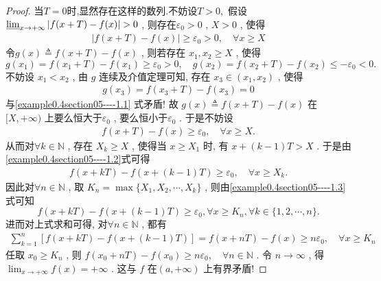 \documentclass[../../main.tex]{subfiles}
\begin{document}
\begin{proof}
当$T=0$时,显然存在这样的数列.不妨设$T>0,$
假设\(\varliminf_{x \to +\infty} \vert f(x + T) - f(x)\vert > 0\) , 则存在\(\varepsilon_0 > 0\) , \(X > 0\) , 使得
\begin{align}
\vert f(x + T) - f(x)\vert \geqslant \varepsilon_0>0,\quad \forall x \geqslant X \label{example0.4section05----1.1}
\end{align}
令\(g(x) \triangleq f(x + T) - f(x)\) , 则若存在 \(x_1, x_2 \geqslant X\) , 使得
\[g(x_1) = f(x_1 + T) - f(x_1) \geqslant \varepsilon_0 > 0 ,\quad g(x_2) = f(x_2 + T) - f(x_2) \leqslant -\varepsilon_0 < 0. \]
不妨设 \(x_1 < x_2\) , 由 \(g\) 连续及介值定理可知, 存在 \(x_3 \in (x_1, x_2)\) , 使得
\begin{align*}
g(x_3) = f(x_3 + T) - f(x_3) = 0
\end{align*}
与\eqref{example0.4section05----1.1} 式矛盾! 故 \(g(x) \triangleq f(x + T) - f(x)\) 在\([X, +\infty)\) 上要么恒大于\(\varepsilon_0\) , 要么恒小于\(\varepsilon_0\) . 于是不妨设
\begin{align}
f(x + T) - f(x) \geqslant \varepsilon_0,\quad \forall x \geqslant X .\label{example0.4section05----1.2}
\end{align}
从而对\(\forall k \in \mathbb{N}\) , 存在 \(X_k \geqslant X\) , 使得当 \(x \geqslant X_1\) 时, 有
\(x + (k - 1)T > X\) .
于是由\eqref{example0.4section05----1.2}式可得
\begin{align}
f(x + kT) - f(x + (k - 1)T) \geqslant \varepsilon_0,\quad \forall x \geqslant X_k. \label{example0.4section05----1.3}
\end{align}
因此对\(\forall n \in \mathbb{N}\) , 取 \(K_n = \max\{X_1, X_2, \cdots, X_k\}\) , 则由\eqref{example0.4section05----1.3}式可知
\[
f(x + kT) - f(x + (k - 1)T)\geqslant \varepsilon_0 , \forall x \geqslant K_n ,\forall k \in \{1, 2, \cdots, n\}.
\]
进而对上式求和可得, 对\(\forall n \in \mathbb{N}\) , 都有
\begin{align*}
\sum_{k = 1}^n [f(x + kT) - f(x + (k - 1)T)] = f(x + nT) - f(x) \geqslant n\varepsilon_0,\quad \forall x \geqslant K_n
\end{align*}
任取 \(x_0 \geqslant K_n\) , 则
\(f(x_0 + nT) - f(x_0) \geqslant n\varepsilon_0,\quad \forall n \in \mathbb{N}\) .
令 \(n \to \infty\) , 得\(\lim_{x \to +\infty} f(x) = +\infty\) . 这与 \(f\) 在\((a, +\infty)\) 上有界矛盾! 

\end{proof}
\end{document}
